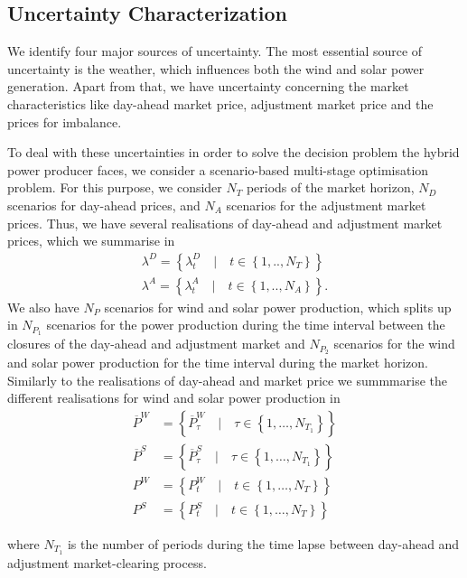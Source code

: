 \subsection{Uncertainty Characterization}\label{sub:Uncertainty_Characterization}

We identify four major sources of uncertainty. The most essential source of uncertainty is the weather, which influences both the wind and solar power generation. Apart from that, we have uncertainty concerning the market characteristics like day-ahead market price, adjustment market price and the prices for imbalance.

To deal with these uncertainties in order to solve the decision problem the hybrid power producer faces, we consider a scenario-based multi-stage optimisation problem. 
For this purpose, we consider $N_{T}$ periods of the market horizon, $N_{D}$ scenarios for day-ahead prices, and $N_{A}$ scenarios for the adjustment market prices. Thus, we have several realisations of day-ahead and adjustment market prices, which we summarise in
\begin{align*}
	\lambda^{D}=\left\{\lambda_{t}^{D} \quad \lvert \quad t \in \left\{1, .., N_{T}\right\}\right\}
	\\ \lambda^{A}=\left\{\lambda_{t}^{A}\quad \lvert \quad t \in \left\{1, .., N_{A}\right\}\right\}.
\end{align*}
We also have $N_P$ scenarios for wind and solar power production, which splits up in $N_{P_1}$ scenarios for the power production during the time interval between the closures of the day-ahead and adjustment market and $N_{P_2}$ scenarios for the wind and solar power production for the time interval during the market horizon. Similarly to the realisations of day-ahead and market price we summmarise the different realisations for wind and solar power production in 
\begin{align*}
\overline{P}^{W} &=\left\{\overline{P}_{\tau}^{W} \quad \lvert \quad \tau \in \left\{1, \dots, N_{T_1}\right\}\right\} \\
\overline{P}^S &=\left\{\overline{P}_{\tau}^{S} \quad \lvert \quad \tau \in \left\{1, \dots, N_{T_1}\right\}\right\} \\
P^W &= \left\{P_{t}^{W} \quad \lvert \quad t \in \left\{1, \dots, N_T\right\}\right\} \\
P^S &= \left\{P_{t}^{S} \quad \lvert \quad t \in \left\{1, \dots, N_T\right\}\right\} 
\end{align*}

where $N_{T_1} $ is the number of periods during the time lapse between day-ahead and adjustment market-clearing process.


